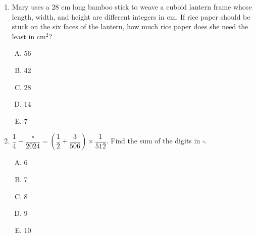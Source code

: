 \documentclass[12pt]{scrartcl}
\begin{document}
\begin{enumerate}
    \newpage
    \item Mary uses a 28 cm long bamboo stick to weave a cuboid lantern frame whose length, width, and height are different integers in cm. If rice paper should be stuck on the six faces of the lantern, how much rice paper does she need the least in cm$^2$?
    \begin{multicols}{5}
        \begin{enumerate}[(A)]
            \item 56
            \item 42
            \item 28
            \item 14
            \item 7
        \end{enumerate}
    \end{multicols} \hrulefill

    \item $\dfrac{1}{4} - \dfrac{\square}{2024} = \left(\dfrac{1}{2} + \dfrac{3}{506}\right) \times \dfrac{1}{512}$. Find the sum of the digits in $\square$.
    \begin{multicols}{5}
        \begin{enumerate}[(A)]
            \item 6
            \item 7
            \item 8
            \item 9
            \item 10
        \end{enumerate}
    \end{multicols} \hrulefill


\end{enumerate}
\end{document}
